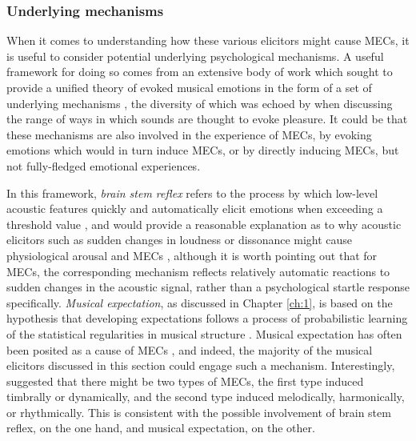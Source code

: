 

\subsubsection{Underlying mechanisms}

When it comes to understanding how these various elicitors might cause MECs, it is useful to consider potential underlying psychological mechanisms. A useful framework for doing so comes from an extensive body of work which sought to provide a unified theory of evoked musical emotions in the form of a set of underlying mechanisms \parencite{juslin2008, juslin2013}, the diversity of which was echoed by \textcite{huron2016} when discussing the range of ways in which sounds are thought to evoke pleasure. It could be that these mechanisms are also involved in the experience of MECs, by evoking emotions which would in turn induce MECs, or by directly inducing MECs, but not fully-fledged emotional experiences.

In this framework, \emph{brain stem reflex} refers to the process by which low-level acoustic features quickly and automatically elicit emotions when exceeding a threshold value \parencite{juslin2013}, and would provide a reasonable explanation as to why acoustic elicitors such as sudden changes in loudness or dissonance might cause physiological arousal and MECs \parencite{harrison2014, juslin2014}, although it is worth pointing out that for MECs, the corresponding mechanism reflects relatively automatic reactions to sudden changes in the acoustic signal, rather than a psychological startle response specifically. \emph{Musical expectation}, as discussed in Chapter \ref{ch:1}, is based on the hypothesis that developing expectations follows a process of probabilistic learning of the statistical regularities in musical structure \parencite{pearce2018, saffran1999}. Musical expectation has often been posited as a cause of MECs \parencite{harrison2014, huron2006, huron2010, juslin2008, juslin2013, mcdermott2012, mencke2019, pearce2012, salimpoor2011, sloboda1991}, and indeed, the majority of the musical elicitors discussed in this section could engage such a mechanism. Interestingly, \textcite{levinson2006} suggested that there might be two types of MECs, the first type induced timbrally or dynamically, and the second type induced melodically, harmonically, or rhythmically. This is consistent with the possible involvement of brain stem reflex, on the one hand, and musical expectation, on the other.

